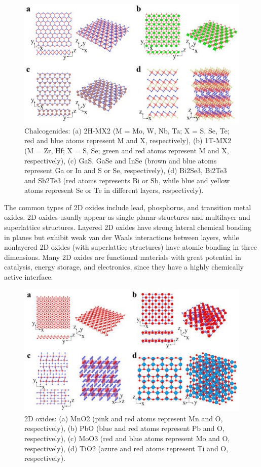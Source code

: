 \documentclass[12pt,a4paper]{report}
\begin{document}
    \begin{figure}
      \centering
      \includegraphics[scale=0.3]{2.3.jpg}
      \caption{Chalcogenides: (a) 2H-MX2 (M = Mo, W, Nb, Ta; X = S, Se, Te; red and blue atoms represent M and X, respectively), (b) 1T-MX2 (M = Zr, Hf; X = S, Se; green and red atoms represent M and X, respectively), (c) GaS, GaSe and InSe (brown and blue atoms represent Ga or In and S or Se, respectively), (d) Bi2Se3, Bi2Te3 and Sb2Te3 (red atoms represents Bi or Sb, while blue and yellow atoms represent Se or Te in different layers, respectively).}
      \label{xenefam}
      \end{figure}

      The common types of 2D oxides include lead, phosphorus, and transition metal oxides. 2D oxides usually appear as single planar structures and multilayer and superlattice structures. Layered 2D oxides have strong lateral chemical bonding in planes but exhibit weak van der Waals interactions between layers, while nonlayered 2D oxides (with superlattice structures) have atomic bonding in three dimensions. Many 2D oxides are functional materials with great potential in catalysis, energy storage, and electronics, since they have a highly chemically active interface.
      
      \begin{figure}
        \centering
        \includegraphics[scale=0.3]{2.4.jpg}
        \caption{2D oxides: (a) MnO2 (pink and red atoms represent Mn and O, respectively), (b) PbO (blue and red atoms represent Pb and O, respectively), (c) MoO3 (red and blue atoms represent Mo and O, respectively), (d) TiO2 (azure and red atoms represent Ti and O, respectively).}
        \label{xotherfam}
        \end{figure}
\end{document}
